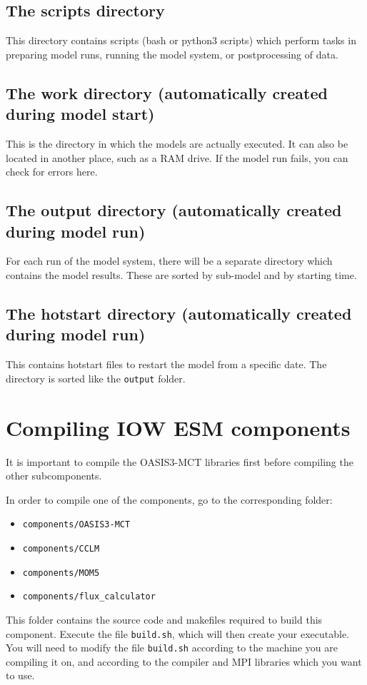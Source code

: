 \documentclass[a4paper,titlepage]{scrartcl}
\begin{document}
\subsection{The scripts directory}
This directory contains scripts (bash or python3 scripts) which perform tasks in preparing model runs, running the model system, or postprocessing of data.

\subsection{The work directory (automatically created during model start)}
This is the directory in which the models are actually executed.
It can also be located in another place, such as a RAM drive.
If the model run fails, you can check for errors here.

\subsection{The output directory (automatically created during model run)}
For each run of the model system, there will be a separate directory which contains the model results.
These are sorted by sub-model and by starting time.

\subsection{The hotstart directory (automatically created during model run)}
This contains hotstart files to restart the model from a specific date.
The directory is sorted like the \texttt{output} folder.

\newpage
\section{Compiling IOW ESM components}
It is important to compile the OASIS3-MCT libraries first before compiling the other subcomponents.

In order to compile one of the components, go to the corresponding folder:
\begin{itemize}
\item \texttt{components/OASIS3-MCT}
\item \texttt{components/CCLM}
\item \texttt{components/MOM5}
\item \texttt{components/flux\_calculator}
\end{itemize}
This folder contains the source code and makefiles required to build this component.
Execute the file \texttt{build.sh}, which will then create your executable.
You will need to modify the file \texttt{build.sh} according to the machine you are compiling it on, and according to the compiler and MPI libraries which you want to use.
\end{document}

